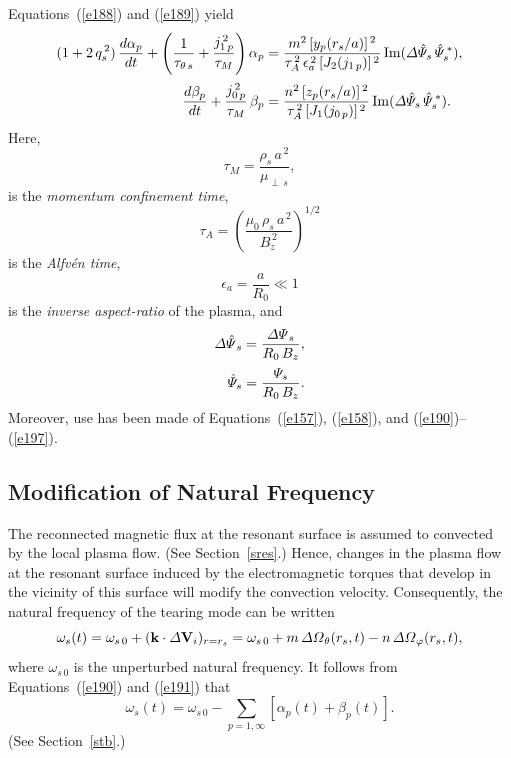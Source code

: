 \documentclass[notitlepage,12pt]{article}
\begin{document}
Equations~(\ref{e188}) and (\ref{e189}) yield
\begin{align}\label{e198}
(1+2\,q_s^{\,2})\,\frac{d\alpha_p}{dt} + \left(\frac{1}{\tau_{\theta\,s}}+\frac{j_{1\,p}^{\,2}}{\tau_{M}}\right)\alpha_p
&= \frac{m^{2}\,[y_p(r_s/a)]^{\,2}}{\tau_A^{\,2}\,\epsilon_a^{\,2}\,[J_2(j_{1\,p})]^{\,2}}\,
{\rm Im}({\mit\Delta\hat{\Psi}_s}\,\hat{\mit\Psi}_s^{\,\ast}),\\[0.5ex]
\frac{d\beta_p}{dt} + \frac{j_{0\,p}^{\,2}}{\tau_{M}}\,\beta_p
&= \frac{n^{2}\,[z_p(r_s/a)]^{\,2}}{\tau_A^{\,2}\,[J_1(j_{0\,p})]^{\,2}}\,
{\rm Im}({\mit\Delta\hat{\Psi}_s}\,\hat{\mit\Psi}_s^{\,\ast}).\label{e199}
\end{align}
Here, 
\begin{equation}
\tau_{M} =\frac{\rho_s\,a^{\,2}}{\mu_{\perp\,s}},
\end{equation} 
is the {\em momentum confinement time}, 
\begin{equation}
\tau_A = \left(\frac{\mu_0\,\rho_s\,a^{\,2}}{B_z^{\,2}}\right)^{1/2}
\end{equation}
 is the {\em Alfv\'{e}n time}, 
 \begin{equation}
 \epsilon_a=\frac{a}{R_0}\ll 1
 \end{equation}
 is the {\em inverse aspect-ratio}\/ of the plasma, and
 \begin{align}
{\mit\Delta\hat{\Psi}}_s &=\frac{{\mit\Delta\Psi}_s}{R_0\,B_z},\label{e204}\\[0.5ex]
 \hat{\mit\Psi}_s &=\frac{{\mit\Psi}_s}{R_0\,B_z}.
 \end{align}
  Moreover,
use has been made of Equations~(\ref{e157}), (\ref{e158}), and (\ref{e190})--(\ref{e197}). 

\subsection{Modification of Natural Frequency}\label{sns}
The reconnected magnetic flux at the resonant surface is assumed to convected by the local plasma flow. (See Section~\ref{sres}.) Hence, changes in the
plasma flow at the resonant surface induced by the electromagnetic torques that develop in the vicinity of this
surface will modify the convection velocity. Consequently, the natural frequency of the tearing mode can be written
\begin{equation}\label{e200}
 \omega_s(t) = \omega_{s\,0} + ({\bf k}\cdot {\mit\Delta}{\bf V}_i)_{r=r_s}=
 \omega_{s\,0} + m\,{\mit\Delta\Omega}_\theta(r_s,t) - n\,{\mit\Delta\Omega}_\varphi(r_s,t),
\end{equation}
where $\omega_{s\,0}$ is the unperturbed natural frequency. 
It follows from Equations~(\ref{e190})
and (\ref{e191}) that
\begin{equation}\label{e201}
\omega_s(t) = \omega_{s\,0} - \sum_{p=1,\infty}\left[\alpha_p(t)+\beta_p(t)\right].
\end{equation}
(See Section~\ref{stb}.)
\end{document}
